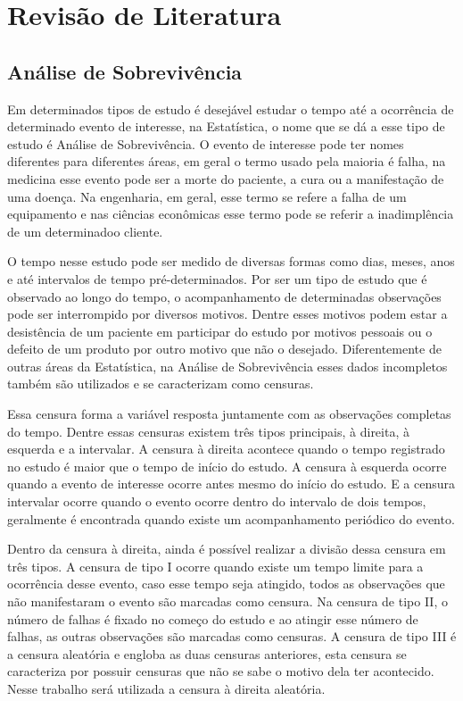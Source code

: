 \documentclass[
	article,
	12pt,				%
	openright,			%
	twoside,			%
	a4paper,			%
	english,			%
	french,				%
	spanish,			%
	brazil				%
	]{abntex2}
\begin{document}
\section{Revisão de Literatura}
\subsection{Análise de Sobrevivência}

Em determinados tipos de estudo é desejável estudar o tempo até a ocorrência de determinado evento de interesse, na Estatística, o nome que se dá a esse tipo de estudo é Análise de Sobrevivência. O evento de interesse pode ter nomes diferentes para diferentes áreas, em geral o termo usado pela maioria é falha, na medicina esse evento pode ser a morte do paciente, a cura ou a manifestação de uma doença. Na engenharia, em geral, esse termo se refere a falha de um equipamento e nas ciências econômicas esse termo pode se referir a inadimplência de um determinadoo cliente.

O tempo nesse estudo pode ser medido de diversas formas como dias, meses, anos e até intervalos de tempo pré-determinados. Por ser um tipo de estudo que é observado ao longo do tempo, o acompanhamento de determinadas observações pode ser interrompido por diversos motivos. Dentre esses motivos podem estar a desistência de um paciente em participar do estudo por motivos pessoais ou o defeito de um produto por outro motivo que não o desejado. Diferentemente de outras áreas da Estatística, na Análise de Sobrevivência esses dados incompletos também são utilizados e se caracterizam como censuras.

Essa censura forma a variável resposta juntamente com as observações completas do tempo. Dentre essas censuras existem três tipos principais, à direita, à esquerda e a intervalar. A censura à direita acontece quando o tempo registrado no estudo é maior que o tempo de início do estudo. A censura à esquerda ocorre quando a evento de interesse ocorre antes mesmo do início do estudo. E a censura intervalar ocorre quando o evento ocorre dentro do intervalo de dois tempos, geralmente é encontrada quando existe um acompanhamento periódico do evento.

Dentro da censura à direita, ainda é possível realizar a divisão dessa censura em três tipos. A censura de tipo I ocorre quando existe um tempo limite para a ocorrência desse evento, caso esse tempo seja atingido, todos as observações que não manifestaram o evento são marcadas como censura. Na censura de tipo II, o número de falhas é fixado no começo do estudo e ao
atingir esse número de falhas, as outras observações são marcadas como censuras. A censura de tipo III é a censura aleatória e engloba as duas censuras anteriores, esta censura se caracteriza por possuir censuras que não se sabe o motivo dela ter acontecido. Nesse trabalho será utilizada a censura à direita aleatória.
\end{document}

